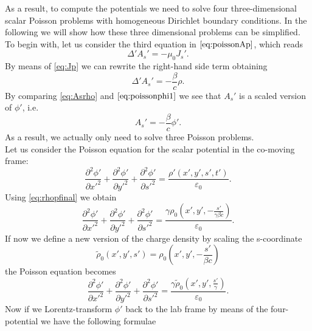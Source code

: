 As a result, to compute the potentials we need to solve four three-dimensional scalar Poisson problems with homogeneous Dirichlet boundary conditions. In the following we will show how these three dimensional problems can be simplified.
To begin with, let us consider the third equation in $\ref{eq:poissonAp}$, which reads
\begin{equation*}
    \Delta ' A_s' = -\mu_0 J_s'.
\end{equation*}
By means of \ref{eq:Jp} we can rewrite the right-hand side term obtaining
\begin{equation}
    \Delta ' A_s' = -\frac{\beta}{c}\rho.
    \label{eq:Asrho}
\end{equation}
By comparing \ref{eq:Asrho} and $\ref{eq:poissonphi1}$ we see that $A_s'$ is a scaled version of $\phi'$, i.e.
\begin{equation}
    A_s' = -\frac{\beta}{c} \phi'.
    \label{eq:aspphip}
\end{equation}
As a result, we actually only need to solve three Poisson problems.\\
Let us consider the Poisson equation for the scalar potential in the co-moving frame:
\begin{equation*}
    \frac{\partial^2 \phi'}{\partial x'^2} + \frac{\partial^2 \phi'}{\partial y'^2} + \frac{\partial^2 \phi'}{\partial s'^2} = \frac{\rho'(x', y', s', t')}{\varepsilon_0}.
\end{equation*}
Using \ref{eq:rhopfinal} we obtain
\begin{equation*}
    \frac{\partial^2 \phi'}{\partial x'^2} + \frac{\partial^2 \phi'}{\partial y'^2} + \frac{\partial^2 \phi'}{\partial s'^2} = \frac{\gamma \rho_0\left(x', y', -\frac{s'}{\gamma \beta c}\right)}{\varepsilon_0}.
\end{equation*}
If now we define a new version of the charge density by scaling the s-coordinate
\begin{equation*}
    \tilde{\rho}_0(x',y',s') = \rho_0 \left(x',y',-\frac{s'}{ \beta c}\right)
\end{equation*}
the Poisson equation becomes
\begin{equation*}
    \frac{\partial^2 \phi'}{\partial x'^2} + \frac{\partial^2 \phi'}{\partial y'^2} + \frac{\partial^2 \phi'}{\partial s'^2} = \frac{\gamma \tilde{\rho}_0\left(x', y', \frac{s'}{\gamma}\right)}{\varepsilon_0}.
    \label{eq:poissonphip}
\end{equation*}
Now if we Lorentz-transform $\phi'$ back to the lab frame by means of the four-potential we have the following formulae
